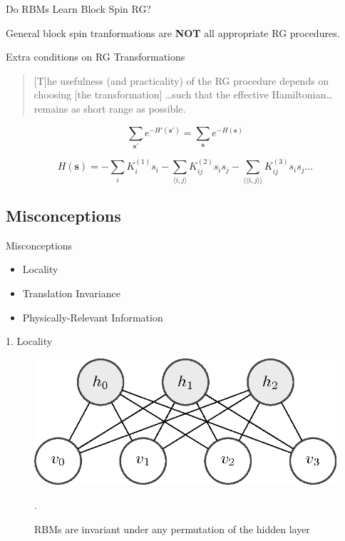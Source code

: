 \documentclass{beamer}
\newcommand{\bolds}[1]{\boldsymbol{#1}}
\newcommand{\expect}[1]{\langle{}{#1}\rangle{}}
\newcommand{\bs}{\bolds{s}}
\begin{document}
\begin{frame}{Do RBMs Learn Block Spin RG?}


  {\huge General block spin tranformations are \textbf{NOT} all
    appropriate RG procedures.  }
\end{frame}

\begin{frame}{Extra conditions on RG Transformations}
  \begin{quote}
    [T]he usefulness (and practicality) of the RG procedure depends on
    choosing [the transformation] \ldots such that the effective
    Hamiltonian\ldots remains as short range as possible.~\cite{kjr}
  \end{quote}

\begin{equation*}%
  \boxed{\sum_{\bs'}e^{-H'(\bs')}=\sum_{\bs}e^{-H(\bs)}}
\end{equation*}

\begin{equation*}%
  H(\bs)=-\sum_i K^{(1)}_{i} s_i - \sum_{\expect{i,j}}K^{(2)}_{ij}s_i s_j-\sum_{\expect{\expect{i,j}}}K^{(3)}_{ij}s_i s_j\ldots
\end{equation*}%

\end{frame}

\subsection{Misconceptions}
\begin{frame}{Misconceptions}


  {\Large
    \begin{itemize}
    \item Locality
    \item Translation Invariance
      \item Physically-Relevant Information
    \end{itemize}
    }

\end{frame}


\begin{frame}{1. Locality}
  \begin{figure}[ht]
    \centering \includegraphics[width=0.7\linewidth]{figures/rbm.png}
    \caption{RBMs are invariant under any permutation of the hidden
      layer~\cite{rbm-1}}.
  \end{figure}
\end{frame}
\end{document}
